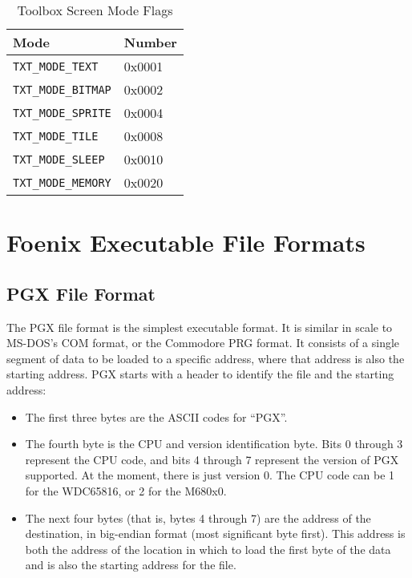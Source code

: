 \begin{table}
	\begin{center}
		\begin{tabular}{|l|l|} \hline
			Mode & Number \\ \hline\hline
			\verb+TXT_MODE_TEXT+ & 0x0001 \\ \hline
			\verb+TXT_MODE_BITMAP+ & 0x0002 \\ \hline
			\verb+TXT_MODE_SPRITE+ & 0x0004 \\ \hline
			\verb+TXT_MODE_TILE+ & 0x0008 \\ \hline
			\verb+TXT_MODE_SLEEP+ & 0x0010 \\ \hline
			\verb+TXT_MODE_MEMORY+ & 0x0020 \\ \hline
		\end{tabular}
	\end{center}
	\caption{Toolbox Screen Mode Flags}
	\label{tbl:fnx_screen_modes}
\end{table}

\section{Foenix Executable File Formats}

\subsection*{PGX File Format}
The PGX file format is the simplest executable format. It is similar in scale to MS-DOS's COM format, or the Commodore PRG format.
It consists of a single segment of data to be loaded to a specific address, where that address is also the starting address.
PGX starts with a header to identify the file and the starting address:

\begin{itemize}
	\item The first three bytes are the ASCII codes for ``PGX''. 
    \item The fourth byte is the CPU and version identification byte.
	Bits 0 through 3 represent the CPU code, and bits 4 through 7 represent the version of PGX supported.
	At the moment, there is just version 0. The CPU code can be 1 for the WDC65816, or 2 for the M680x0.
    \item The next four bytes (that is, bytes 4 through 7) are the address of the destination, in big-endian format (most significant byte first).
	This address is both the address of the location in which to load the first byte of the data and is also the starting address for the file.
\end{itemize}

